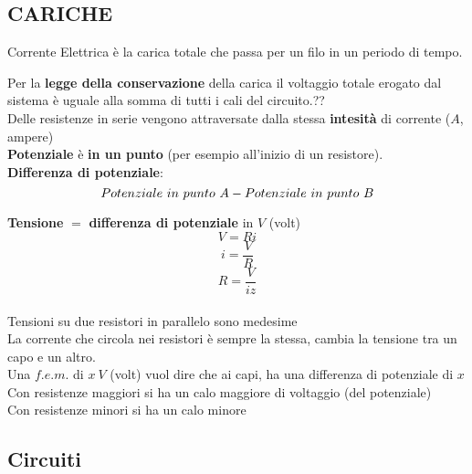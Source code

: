 \documentclass{article}
\begin{document}
\subsection{CARICHE}

Corrente Elettrica è la carica totale che passa per un filo in un periodo di tempo.

Per la \textbf{legge della conservazione} della carica il voltaggio totale erogato dal sistema è uguale alla somma di tutti i cali del circuito.??\\

Delle resistenze in serie vengono attraversate dalla stessa \textbf{intesità} di corrente ($A$, ampere)\\

\textbf{Potenziale} è \textbf{in un punto} (per esempio all'inizio di un resistore).\\

\textbf{Differenza di potenziale}:
\begin{equation*}
  Potenziale\ in\ punto\ A - Potenziale\ in\ punto\ B\\
\end{equation*}

\textbf{Tensione} $=$ \textbf{differenza di potenziale} in $V$ (volt)
\begin{equation*}
  V=Ri
\end{equation*}
\begin{equation*}
    i=\frac{V}{R}
\end{equation*}
\begin{equation*}
  R=\frac{V}{iz}
\end{equation*}\\

Tensioni su due resistori in parallelo sono medesime\\

La corrente che circola nei resistori è sempre la stessa, cambia la tensione tra un capo e un altro.\\

Una $f.e.m.$ di $x\ V$ (volt) vuol dire che ai capi, ha una differenza di potenziale di $x$\\

Con resistenze maggiori si ha un calo maggiore di voltaggio (del potenziale)\\

Con resistenze minori si ha un calo minore


\subsection{Circuiti}
\end{document}
